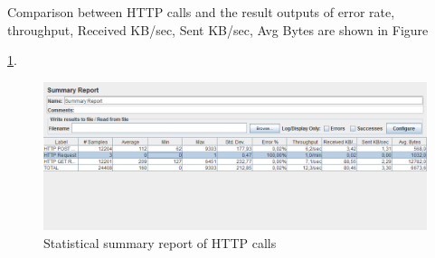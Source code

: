 \newpage

Comparison between HTTP calls and the result outputs of error rate, throughput, Received KB/sec, Sent KB/sec, Avg Bytes are shown in Figure

\ref{fig:summaryReport}.

\begin{figure}[!htbp]
\centering
\includegraphics[width=\textwidth]{projectChapters/images/summaryReport.png}
\caption{Statistical summary report of HTTP calls}
\label{fig:summaryReport}
\end{figure}












